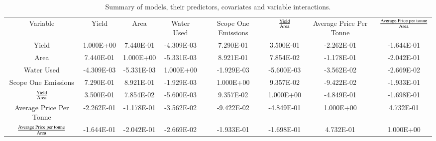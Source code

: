 \documentclass[review,12pt,authoryear]{elsarticle}
\begin{document}
\begin{linenumbers}
 \begin{table}[]
  \centering
  \caption{Summary of models, their predictors, covariates and variable interactions.}
  \label{tab:tab2}
  \begin{tabulary}{\textwidth}{CCCCCCCC}
  Variable                             & Yield      & Area       & Water Used & Scope One Emissions & $\textrm{Yield}\over\textrm{Area}$ & Average Price Per Tonne & ${\textrm{Average Price per tonne}\over\textrm{Area}}$ \\
  Yield                                & 1.000E+00  & 7.440E-01  & -4.309E-03 & 7.290E-01           & 3.500E-01            & -2.262E-01              & -1.644E-01                           \\
  Area                                 & 7.440E-01  & 1.000E+00  & -5.331E-03 & 8.921E-01           & 7.854E-02            & -1.178E-01              & -2.042E-01                           \\
  Water Used                           & -4.309E-03 & -5.331E-03 & 1.000E+00  & -1.929E-03          & -5.600E-03           & -3.562E-02              & -2.669E-02                           \\
  Scope One Emissions                  & 7.290E-01  & 8.921E-01  & -1.929E-03 & 1.000E+00           & 9.357E-02            & -9.422E-02              & -1.933E-01                           \\
  $\textrm{Yield}\over\textrm{Area}$                 & 3.500E-01  & 7.854E-02  & -5.600E-03 & 9.357E-02           & 1.000E+00            & -4.849E-01              & -1.698E-01                           \\
  Average Price Per Tonne              & -2.262E-01 & -1.178E-01 & -3.562E-02 & -9.422E-02          & -4.849E-01           & 1.000E+00               & 4.732E-01                            \\
  ${\textrm{Average Price per tonne}\over\textrm{Area}}$ & -1.644E-01 & -2.042E-01 & -2.669E-02 & -1.933E-01          & -1.698E-01           & 4.732E-01               & 1.000E+00                           
  \end{tabulary}
  \end{table}


\end{linenumbers}
\end{document}
